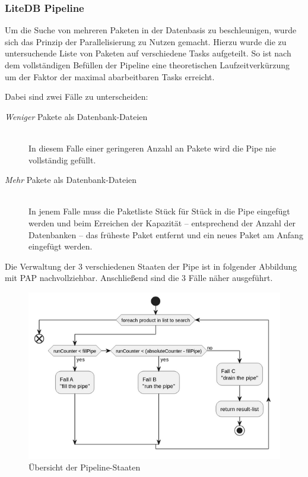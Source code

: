 \subsubsection{LiteDB Pipeline} \label{sec:ExperimentePIPE}
    Um die Suche von mehreren Paketen in der Datenbasis zu beschleunigen, wurde sich das Prinzip der Parallelisierung zu Nutzen gemacht.
    Hierzu wurde die zu untersuchende Liste von Paketen auf verschiedene Tasks aufgeteilt.
    So ist nach dem vollständigen Befüllen der Pipeline eine theoretischen Laufzeitverkürzung um der Faktor der maximal abarbeitbaren Tasks erreicht.  
    
    Dabei sind zwei Fälle zu unterscheiden:
    \begin{description}
        \item[\textit{Weniger} Pakete als Datenbank-Dateien]\hfill \\
            In diesem Falle einer geringeren Anzahl an Pakete wird die Pipe nie vollständig gefüllt.
        \item[\textit{Mehr} Pakete als Datenbank-Dateien]\hfill \\
            In jenem Falle muss die Paketliste Stück für Stück in die Pipe eingefügt werden und beim Erreichen der Kapazität -- entsprechend der Anzahl der Datenbanken -- das früheste Paket entfernt und ein neues Paket am Anfang eingefügt werden.
    \end{description}
    
    Die Verwaltung der 3 verschiedenen Staaten der Pipe ist in folgender Abbildung mit \ac{PAP} nachvollziehbar.
    Anschließend sind die 3 Fälle näher ausgeführt.
    \begin{figure}[H]
        \centering
        \includegraphics[width=\textwidth]{../pap/Simultanius search on LiteDb-Files_k.png}
        \caption{Übersicht der Pipeline-Staaten}
        \label{png:OverviewPipelineStatus}
    \end{figure}

